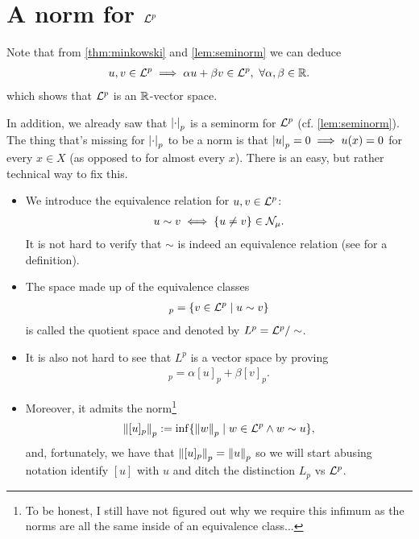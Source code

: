 \section{\texorpdfstring{A norm for $\mathcal{L}^p$}{A norm for Lp}}

\begin{remark}
	Note that from \autoref{thm:minkowski} and \autoref{lem:seminorm} we can deduce
	\begin{align}
		u, v \in \mathcal{L}^p \implies \alpha u  + \beta v \in \mathcal{L}^p,\ \forall \alpha, \beta \in \mathbb{R}.
	\end{align}
	which shows that $\mathcal{L}^p$ is an $\mathbb{R}$-vector space.
\end{remark}

In addition, we already saw that $\left\vert{\cdot}\right\vert_p$ is a seminorm for $\mathcal{L}^p$ (cf. \autoref{lem:seminorm}). The thing that's missing for $\left\vert{\cdot}\right\vert_p$ to be a norm is that $\left\vert{u}\right\vert_p = 0 \implies u(x) = 0$ for every $x \in X$ (as opposed to for almost every $x$). There is an easy, but rather technical way to fix this.

\begin{itemize}
	\item We introduce the equivalence relation for $u, v\in \mathcal{L}^p$:
	\begin{align*}
		u \sim v \iff \{u \neq v \} \in \mathcal{N}_\mu.
	\end{align*}
	It is not hard to verify that $\sim$ is indeed an equivalence relation (see \cite{wiki-equiv} for a definition).
	
	\item The space made up of the equivalence classes
	\begin{align*}
		[u]_p = \{ v \in \Lp \mid u \sim v\}
	\end{align*}
	is called the quotient space and denoted by $L^p = \mathcal{L}^p / \sim$.
	
	\item It is also not hard to see that $L^p$ is a vector space by proving
	\begin{align*}
		[\alpha u + \beta v]_p = \alpha[u]_p + \beta[v]_p.
	\end{align*}
	
	\item Moreover, it admits the norm\footnote{To be honest, I still have not figured out why we require this infimum as the norms are all the same inside of an equivalence class...}
	\begin{align*}
		\left\Vert{[u]_p}\right\Vert_p := \inf \{ \left\Vert{w}\right\Vert_p \mid w \in \mathcal{L}^p \land w \sim u\},
	\end{align*}
	and, fortunately, we have that $\left\Vert{[u]_p}\right\Vert_p = \left\Vert{u}\right\Vert_p$ so we will start abusing notation identify $[u]$ with $u$ and ditch the distinction $L_p$ vs $\mathcal{L}^p$.
\end{itemize}

